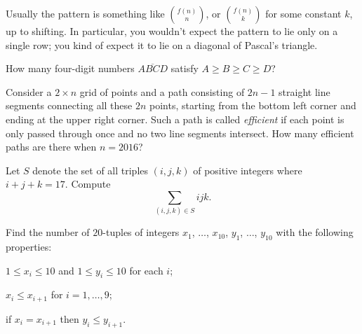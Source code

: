 \documentclass[11pt,paper=letter]{scrartcl}
\begin{document}
Usually the pattern is something like $\binom{f(n)}{n}$, or $\binom{f(n)}{k}$ for some constant $k$, up to shifting. In particular, you wouldn't expect the pattern to lie only on a single row; you kind of expect it to lie on a diagonal of Pascal's triangle.

\begin{mdframed}[style=exmdbox]

\begin{problem}
  How many four-digit numbers $\overline{ABCD}$ satisfy $A \ge B \ge C \ge D$? \hint{\ref{h:7}}
\end{problem}

\begin{problem}
  Consider a $2 \times n$ grid of points and a path consisting of $2n-1$ straight line segments connecting all these $2n$ points, starting from the bottom left corner and ending at the upper right corner. Such a path is called \textit{efficient} if each point is only passed through once and no two line segments intersect. How many efficient paths are there when $n = 2016$?
\end{problem}

\begin{problem}
Let $S$ denote the set of all triples $(i, j, k)$ of positive integers where $i + j + k = 17$. Compute
\[
  \sum_{(i, j, k) \in S} ijk.
\]
\end{problem}

\begin{problem}
Find the number of $20$-tuples of integers $x_1$, $\ldots$, $x_{10}$, $y_1$, $\ldots$, $y_{10}$ with the following properties:
\begin{itemthin}
  \item $1 \le x_i \le 10$ and $1 \le y_i \le 10$ for each $i$;
  \item $x_i \le x_{i+1}$ for $i=1,\dots,9$;
  \item if $x_i = x_{i+1}$ then $y_i \le y_{i+1}$.
\end{itemthin}
\end{problem}

\end{mdframed}

\end{document}
